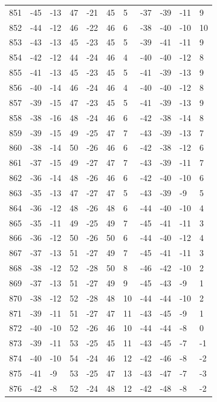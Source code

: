 \begin{table}[H]
\begin{tabular}{lllllllllll}
851 & -45 & -13 & 47 & -21 & 45 & 5 & -37 & -39 & -11 & 9 \\
852 & -44 & -12 & 46 & -22 & 46 & 6 & -38 & -40 & -10 & 10 \\
853 & -43 & -13 & 45 & -23 & 45 & 5 & -39 & -41 & -11 & 9 \\
854 & -42 & -12 & 44 & -24 & 46 & 4 & -40 & -40 & -12 & 8 \\
855 & -41 & -13 & 45 & -23 & 45 & 5 & -41 & -39 & -13 & 9 \\
856 & -40 & -14 & 46 & -24 & 46 & 4 & -40 & -40 & -12 & 8 \\
857 & -39 & -15 & 47 & -23 & 45 & 5 & -41 & -39 & -13 & 9 \\
858 & -38 & -16 & 48 & -24 & 46 & 6 & -42 & -38 & -14 & 8 \\
859 & -39 & -15 & 49 & -25 & 47 & 7 & -43 & -39 & -13 & 7 \\
860 & -38 & -14 & 50 & -26 & 46 & 6 & -42 & -38 & -12 & 6 \\
861 & -37 & -15 & 49 & -27 & 47 & 7 & -43 & -39 & -11 & 7 \\
862 & -36 & -14 & 48 & -26 & 46 & 6 & -42 & -40 & -10 & 6 \\
863 & -35 & -13 & 47 & -27 & 47 & 5 & -43 & -39 & -9 & 5 \\
864 & -36 & -12 & 48 & -26 & 48 & 6 & -44 & -40 & -10 & 4 \\
865 & -35 & -11 & 49 & -25 & 49 & 7 & -45 & -41 & -11 & 3 \\
866 & -36 & -12 & 50 & -26 & 50 & 6 & -44 & -40 & -12 & 4 \\
867 & -37 & -13 & 51 & -27 & 49 & 7 & -45 & -41 & -11 & 3 \\
868 & -38 & -12 & 52 & -28 & 50 & 8 & -46 & -42 & -10 & 2 \\
869 & -37 & -13 & 51 & -27 & 49 & 9 & -45 & -43 & -9 & 1 \\
870 & -38 & -12 & 52 & -28 & 48 & 10 & -44 & -44 & -10 & 2 \\
871 & -39 & -11 & 51 & -27 & 47 & 11 & -43 & -45 & -9 & 1 \\
872 & -40 & -10 & 52 & -26 & 46 & 10 & -44 & -44 & -8 & 0 \\
873 & -39 & -11 & 53 & -25 & 45 & 11 & -43 & -45 & -7 & -1 \\
874 & -40 & -10 & 54 & -24 & 46 & 12 & -42 & -46 & -8 & -2 \\
875 & -41 & -9 & 53 & -25 & 47 & 13 & -43 & -47 & -7 & -3 \\
876 & -42 & -8 & 52 & -24 & 48 & 12 & -42 & -48 & -8 & -2 \\

\end{tabular}
\end{table}
